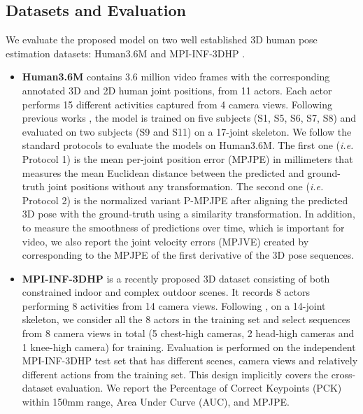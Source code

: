 \documentclass[journal]{IEEEtran}
\begin{document}
\subsection{Datasets and Evaluation}
We evaluate the proposed model on two well established 3D human pose estimation datasets: Human3.6M \cite{ionescu2013human3} and MPI-INF-3DHP \cite{mehta2017monocular}.
\begin{itemize}[leftmargin=0.2in]
\setlength\itemsep{0.0em}

\item \textbf{Human3.6M} contains 3.6 million video frames with the corresponding annotated 3D and 2D human joint positions, from 11 actors. Each actor performs 15 different activities captured from 4 camera views. Following previous works \cite{pavllo20193d,lee2018propagating,rayat2018exploiting,sun2017compositional,martinez2017simple}, the model is trained on five subjects (S1, S5, S6, S7, S8) and evaluated
on two subjects (S9 and S11) on a 17-joint skeleton. We follow the standard protocols to evaluate the models on Human3.6M. The first one (\emph{i.e.} Protocol 1) is the mean per-joint position error (MPJPE) in millimeters that measures the mean Euclidean distance between the predicted and ground-truth joint positions without any transformation. The second one (\emph{i.e.} Protocol 2) is the normalized variant P-MPJPE after aligning the predicted 3D pose with the ground-truth using a similarity transformation. In addition, to measure the smoothness
of predictions over time, which is important for video, we also report the joint velocity errors (MPJVE) created by \cite{pavllo20193d} corresponding to the MPJPE of the first derivative of the
3D pose sequences.

\item \textbf{MPI-INF-3DHP} is a recently proposed 3D dataset consisting of both constrained indoor and complex outdoor scenes. It records 8 actors performing 8 activities from 14 camera views. Following \cite{mehta2017vnect,mehta2017monocular}, on a 14-joint skeleton, we consider all the 8 actors in the training set and select sequences from 8 camera views in total (5 chest-high cameras, 2 head-high cameras and 1 knee-high camera) for training. Evaluation is performed on the independent MPI-INF-3DHP test set that has different scenes, camera views and relatively different actions from
the training set. This design implicitly covers the cross-dataset evaluation. We report the Percentage of Correct Keypoints (PCK) within 150mm range, Area Under Curve (AUC), and MPJPE. 

\end{itemize}
\end{document}
